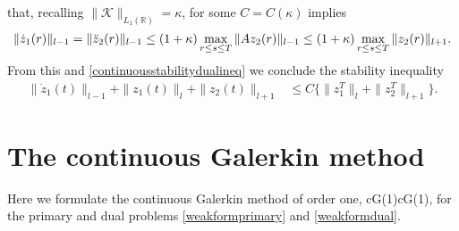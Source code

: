 \documentclass{amsart}
\numberwithin{equation}{section}
\theoremstyle{definition}
\begin{document}
that, recalling $\|{\mathcal K}\|_{L_1(\mathbb{R})}=\kappa$, for some $C=C(\kappa)$ implies
\begin{equation*}
  \|\dot z_1(r)\|_{l-1}
  =\|\ddot z_2(r)\|_{l-1}\\
  \le (1+\kappa) \max_{r \leq s\leq T} \| Az_2(r)\|_{l-1} 
  \le (1+\kappa) \max_{r \leq s\leq T} \| z_2(r)\|_{l+1} .
\end{equation*}
From this and \eqref{continuousstabilitydualineq} we conclude the stability inequality 
\begin{equation}   \label{stabilitydualineq}
  \begin{split}
    \|\dot z_1(t)\|_{l-1}+\|z_1(t)\|_l+\|z_2(t)\|_{l+1}
    &\le C\big\{\|z_1^T\|_l+\|z_2^T\|_{l+1}\big\}.
  \end{split}
\end{equation}

\section{{\bf The continuous Galerkin method}}
Here we formulate the continuous Galerkin method of order one, 
cG(1)cG(1), for the primary and dual problems \eqref{weakformprimary} 
and \eqref{weakformdual}. 
\end{document}
